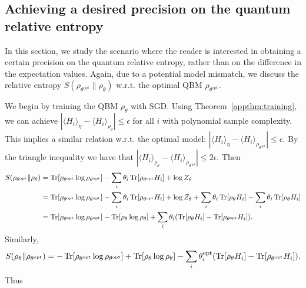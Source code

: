 \documentclass[
    reprint,
    aps,
    prx,
    longbibliography
]{revtex4-2}
\begin{document}
\subsection*{Achieving a desired precision on the quantum relative entropy}

In this section, we study the scenario where the reader is interested in obtaining a certain precision on the quantum relative entropy, rather than on the difference in the expectation values. Again, due to a potential model mismatch, we discuss the relative entropy $S(\rho_{\theta^\mathrm{opt}} \| \rho_{\theta})$ w.r.t. the optimal QBM $\rho_{\theta^\mathrm{opt}}$.

We begin by training the QBM $\rho_{\theta}$ with SGD. Using Theorem~\ref{appthm:training}, we can achieve $|\langle H_{i}\rangle_\eta -\langle H_{i} \rangle_{\rho_\theta} | \leq \epsilon$ for all $i$ with polynomial sample complexity. This implies a similar relation w.r.t. the optimal model: $| \langle H_{i}\rangle_\eta -\langle H_{i} \rangle_{\rho_{\theta^\mathrm{opt}}} | \leq \epsilon$. By the triangle inequality we have that $| \langle H_{i}\rangle_{\rho_\theta} - \langle H_{i} \rangle_{\rho_{\theta^\mathrm{opt}}} | \leq 2\epsilon$.
Then
\begin{align}
\begin{split}
S(\rho_{\theta^\mathrm{opt}} \| \rho_\theta) &=\Tr[\rho_{\theta^\mathrm{opt}} \log \rho_{\theta^\mathrm{opt}}] - \sum_i \theta_i \Tr[\rho_{\theta^\mathrm{opt}} H_i] + \log{Z_{\theta}} \\
&= \Tr[\rho_{\theta^\mathrm{opt}} \log \rho_{\theta^\mathrm{opt}}] - \sum_i \theta_i \Tr[\rho_{\theta^\mathrm{opt}} H_i] + \log Z_\theta + \sum_i \theta_i \Tr[\rho_{\theta} H_i] -  \sum_i \theta_i \Tr[\rho_{\theta} H_i] \\
&= \Tr[\rho_{\theta^\mathrm{opt}} \log \rho_{\theta^\mathrm{opt}}] - \Tr[\rho_{\theta} \log \rho_{\theta}] + \sum_i \theta_i ( \Tr[\rho_{\theta} H_i] - \Tr[\rho_{\theta^\mathrm{opt}} H_i] ).
\end{split}
\end{align}
Similarly,
\begin{align}
S(\rho_{\theta} \| \rho_{\theta^\mathrm{opt}}) =  - \Tr[\rho_{\theta^\mathrm{opt}} \log \rho_{\theta^\mathrm{opt}}] + \Tr[\rho_{\theta} \log \rho_{\theta}] - \sum_i \theta^\textrm{opt}_i ( \Tr[\rho_{\theta} H_i] - \Tr[\rho_{\theta^\mathrm{opt}} H_i] ). 
\end{align}
Thus
\end{document}
